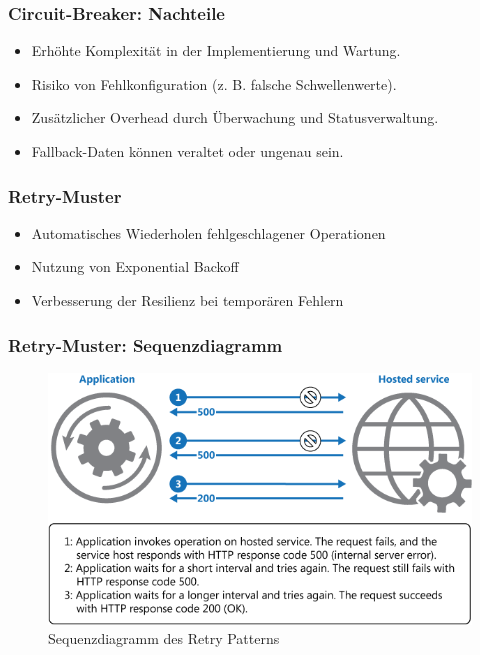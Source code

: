 \begin{frame}
    \frametitle{Circuit-Breaker: Nachteile}
    \begin{itemize}
        \item Erhöhte Komplexität in der Implementierung und Wartung.
        \item Risiko von Fehlkonfiguration (z. B. falsche Schwellenwerte).
        \item Zusätzlicher Overhead durch Überwachung und Statusverwaltung.
        \item Fallback-Daten können veraltet oder ungenau sein.
    \end{itemize}
\end{frame}


\begin{frame}
    \frametitle{Retry-Muster}
    \begin{itemize}
        \item Automatisches Wiederholen fehlgeschlagener Operationen
        \item Nutzung von Exponential Backoff
        \item Verbesserung der Resilienz bei temporären Fehlern
    \end{itemize}
\end{frame}

\begin{frame}
    \frametitle{Retry-Muster: Sequenzdiagramm}
    \begin{figure}[h]
        \centering
        \includegraphics[height=0.5\textheight]{images/retry-pattern}
        \caption{Sequenzdiagramm des Retry Patterns}
    \end{figure}
\end{frame}


